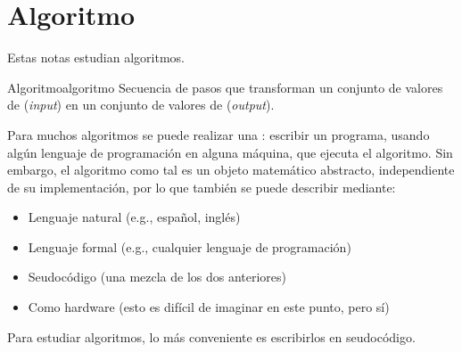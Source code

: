 \section{Algoritmo}

Estas notas estudian algoritmos.

\begin{definicion}{Algoritmo}{algoritmo}
Secuencia de pasos que transforman un conjunto de valores de  (\textit{input}) en un conjunto de valores de  (\textit{output}).
\end{definicion}

Para muchos algoritmos se puede realizar una : escribir un programa, usando algún lenguaje de programación en alguna máquina, que ejecuta el algoritmo. Sin embargo, el algoritmo como tal es un objeto matemático abstracto, independiente de su implementación, por lo que también se puede describir mediante:
\begin{itemize}
  \item Lenguaje natural (e.g., español, inglés)
  \item Lenguaje formal (e.g., cualquier lenguaje de programación)
  \item Seudocódigo (una mezcla de los dos anteriores)
  \item Como hardware (esto es difícil de imaginar en este punto, pero sí)
\end{itemize}

Para estudiar algoritmos, lo más conveniente es escribirlos en seudocódigo.


